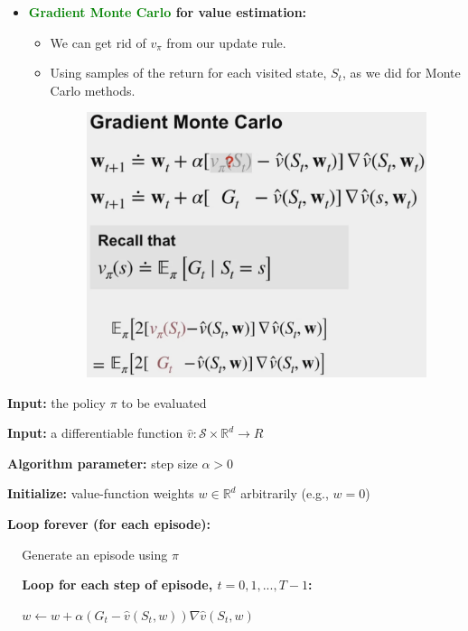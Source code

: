 \documentclass[12pt, a4paper]{article}
\begin{document}
\begin{itemize}
\begin{itemize}
  \end{itemize}

  \item \textbf{\textcolor{Green}{Gradient Monte Carlo} for value estimation:}

  \begin{itemize}
    \item We can get rid of $v_\pi$ from our update rule.
    \item Using samples of the return for each visited state, $S_t$, as we did for Monte Carlo methods.
    \begin{figure}[H]
      \centering
        \includegraphics[width=0.6\columnwidth]{images/gradient-monte-carlo.png}
        \label{fig:gradient-monte-carlo}
    \end{figure}
  \end{itemize}

\end{itemize}




\begin{tcolorbox}[title={Gradient Monte Carlo Algorithm for Estimating $\hat{v} \approx v_\pi$}]

  \textbf{Input:} the policy $\pi$ to be evaluated

  \textbf{Input:} a differentiable function $\hat{v}: \mathcal{S} \times \mathbb{R}^d \to R$

  \textbf{Algorithm parameter:} step size $\alpha > 0$

  \textbf{Initialize:} value-function weights $w \in \mathbb{R}^d$ arbitrarily (e.g., $w=0$)

  \textbf{Loop forever (for each episode):}
  \begin{description}
      \item $\;\;\;$ Generate an episode using $\pi$
      \item $\;\;\;$ \textbf{Loop for each step of episode, $t=0,1,...,T-1$:}
      \begin{description}
        \item $\;\;\;$ $w \leftarrow w + \alpha (G_t -\hat{v}(S_t, w)) \nabla \hat{v}(S_t, w)$
      \end{description}
  \end{description}
\end{tcolorbox}
\end{document}
